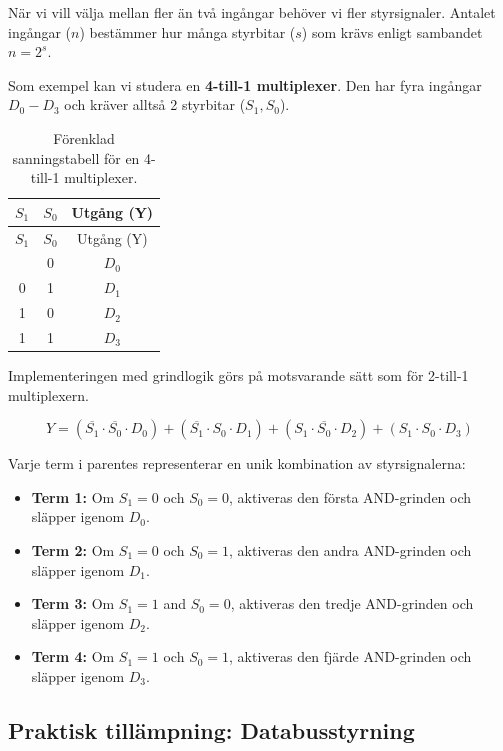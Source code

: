 \documentclass[
  swedish,
  letterpaper,
  oneside,
  openany]{book}
\providecommand{\tightlist}{%
  \setlength{\itemsep}{0pt}\setlength{\parskip}{0pt}}
\begin{document}
När vi vill välja mellan fler än två ingångar behöver vi fler
styrsignaler. Antalet ingångar (\(n\)) bestämmer hur många styrbitar
(\(s\)) som krävs enligt sambandet \(n = 2^s\).

Som exempel kan vi studera en \textbf{4-till-1 multiplexer}. Den har
fyra ingångar \(D_0 - D_3\) och kräver alltså 2 styrbitar
(\(S_1, S_0\)).

\begin{longtable}[]{@{}ccc@{}}
\caption{Förenklad sanningstabell för en 4-till-1
multiplexer.}\label{tbl-4-to-1-multiplexer}\tabularnewline
\toprule\noalign{}
\(S_1\) & \(S_0\) & Utgång (Y) \\
\midrule\noalign{}
\endfirsthead
\toprule\noalign{}
\(S_1\) & \(S_0\) & Utgång (Y) \\
\midrule\noalign{}
\endhead
\bottomrule\noalign{}
\endlastfoot
0 & 0 & \(D_0\) \\
0 & 1 & \(D_1\) \\
1 & 0 & \(D_2\) \\
1 & 1 & \(D_3\) \\
\end{longtable}

Implementeringen med grindlogik görs på motsvarande sätt som för
2-till-1 multiplexern.

\[Y = (\overline{S_1} \cdot \overline{S_0} \cdot D_0) + (\overline{S_1} \cdot S_0 \cdot D_1) + (S_1 \cdot \overline{S_0} \cdot D_2) + (S_1 \cdot S_0 \cdot D_3)\]

Varje term i parentes representerar en unik kombination av
styrsignalerna:

\begin{itemize}
\tightlist
\item
  \textbf{Term 1:} Om \(S_1=0\) och \(S_0=0\), aktiveras den första
  AND-grinden och släpper igenom \(D_0\).
\item
  \textbf{Term 2:} Om \(S_1=0\) och \(S_0=1\), aktiveras den andra
  AND-grinden och släpper igenom \(D_1\).
\item
  \textbf{Term 3:} Om \(S_1=1\) and \(S_0=0\), aktiveras den tredje
  AND-grinden och släpper igenom \(D_2\).
\item
  \textbf{Term 4:} Om \(S_1=1\) och \(S_0=1\), aktiveras den fjärde
  AND-grinden och släpper igenom \(D_3\).
\end{itemize}

\subsection{Praktisk tillämpning:
Databusstyrning}\label{praktisk-tilluxe4mpning-databusstyrning}
\end{document}
